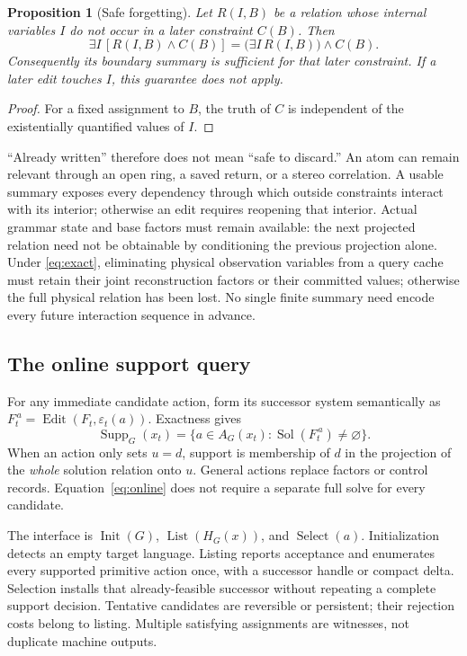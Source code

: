 \documentclass[11pt,a4paper]{article}
\newtheorem{proposition}{Proposition}
\newcommand{\Sol}{\operatorname{Sol}}
\newcommand{\Supp}{\operatorname{Supp}}
\begin{document}
\begin{proposition}[Safe forgetting]\label{prop:forget}
Let \(R(I,B)\) be a relation whose internal variables \(I\) do not occur in a
later constraint \(C(B)\). Then
\begin{equation}\label{eq:forget}
 \exists I\,[R(I,B)\land C(B)]
   =\bigl(\exists I\,R(I,B)\bigr)\land C(B).
\end{equation}
Consequently its boundary summary is sufficient for that later constraint.
If a later edit touches \(I\), this guarantee does not apply.
\end{proposition}
\begin{proof}
For a fixed assignment to \(B\), the truth of \(C\) is independent of the
existentially quantified values of \(I\).
\end{proof}

``Already written'' therefore does not mean ``safe to discard.'' An atom can
remain relevant through an open ring, a saved return, or a stereo correlation.
A usable summary exposes every dependency through which outside constraints
interact with its interior; otherwise an edit requires reopening that interior.
Actual grammar state and base factors must remain available: the next projected
relation need not be obtainable by conditioning the previous projection alone.
Under \eqref{eq:exact}, eliminating physical observation variables from a query
cache must retain their joint reconstruction factors or their committed values;
otherwise the full physical relation has been lost. No single finite summary
need encode every future interaction sequence in advance.\cite{note126,note127}

\subsection{The online support query}
For any immediate candidate action, form its successor system semantically as
\(F_t^{\,a}=\operatorname{Edit}(F_t,\varepsilon_t(a))\). Exactness gives
\begin{equation}\label{eq:online}
 \boxed{\Supp_G(x_t)=
   \{a\in A_G(x_t):\Sol(F_t^{\,a})\ne\varnothing\}.}
\end{equation}
When an action only sets \(u=d\), support is membership of \(d\) in the projection
of the \emph{whole} solution relation onto \(u\). General actions replace factors
or control records. Equation~\eqref{eq:online} does not require a separate full
solve for every candidate.

The interface is \(\operatorname{Init}(G)\), \(\operatorname{List}(H_G(x))\), and
\(\operatorname{Select}(a)\). Initialization detects an empty target language.
Listing reports acceptance and enumerates every supported primitive action
once, with a successor handle or compact delta. Selection installs that
already-feasible successor without repeating a complete support decision.
Tentative candidates are reversible or persistent; their rejection costs belong
to listing. Multiple satisfying assignments are witnesses, not duplicate machine
outputs.\cite{note127}
\end{document}
